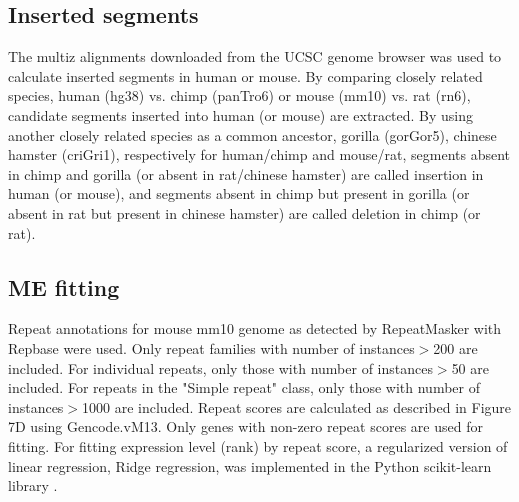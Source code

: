 
\subsection{Inserted segments}
The multiz alignments downloaded from the UCSC genome browser \citep{Kent_2002} was used to calculate inserted segments in human or mouse. By comparing closely related species, human (hg38) vs. chimp (panTro6) or mouse (mm10) vs. rat (rn6), candidate segments inserted into human (or mouse) are extracted. By using another closely related species as a common ancestor, gorilla (gorGor5), chinese hamster (criGri1), respectively for human/chimp and mouse/rat, segments absent in chimp and gorilla (or absent in rat/chinese hamster) are called insertion in human (or mouse), and segments absent in chimp but present in gorilla (or absent in rat but present in chinese hamster) are called deletion in chimp (or rat). 

\subsection{ME fitting}
Repeat annotations for mouse mm10 genome as detected by RepeatMasker \citep{repeatmasker} with Repbase \citep[ver. 20140131][]{Bao_2015} were used. Only repeat families with number of instances$>$200 are included. For individual repeats, only those with number of instances$>$50 are included. For repeats in the "Simple repeat" class, only those with number of instances$>$1000 are included. Repeat scores are calculated as described in Figure 7D using Gencode.vM13. Only genes with non-zero repeat scores are used for fitting. For fitting expression level (rank) by repeat score, a regularized version of linear regression, Ridge regression, was implemented in the Python scikit-learn library \citep{scikit-learn}.

